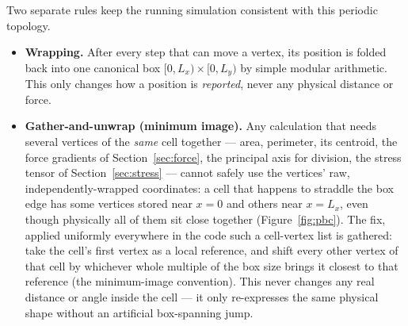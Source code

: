 \documentclass[11pt]{article}
\begin{document}
Two separate rules keep the running simulation consistent with this periodic topology.
\begin{itemize}
  \item \textbf{Wrapping.} After every step that can move a vertex, its position is
  folded back into one canonical box $[0,L_x)\times[0,L_y)$ by simple modular
  arithmetic. This only changes how a position is \emph{reported}, never any physical
  distance or force.
  \item \textbf{Gather-and-unwrap (minimum image).} Any calculation that needs several
  vertices of the \emph{same} cell together --- area, perimeter, its centroid, the
  force gradients of Section~\ref{sec:force}, the principal axis for division, the
  stress tensor of Section~\ref{sec:stress} --- cannot safely use the vertices' raw,
  independently-wrapped coordinates: a cell that happens to straddle the box edge has
  some vertices stored near $x=0$ and others near $x=L_x$, even though physically all
  of them sit close together (Figure~\ref{fig:pbc}). The fix, applied uniformly
  everywhere in the code such a cell-vertex list is gathered: take the cell's first
  vertex as a local reference, and shift every other vertex of that cell by whichever
  whole multiple of the box size brings it closest to that reference (the
  minimum-image convention). This never changes any real distance or angle inside the
  cell --- it only re-expresses the same physical shape without an artificial
  box-spanning jump.
\end{itemize}
\end{document}
